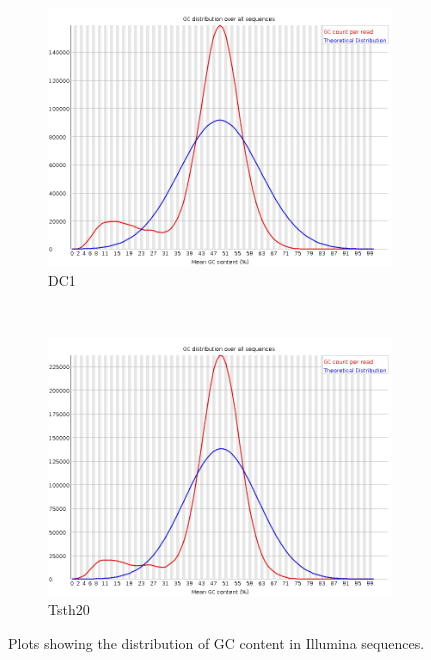 \begin{figure}
  \centering
  \begin{subfigure}{0.7\textwidth}
    \includegraphics[width=\textwidth]{figures/dc1-low-gc-fastqc.png}
    \caption{DC1}
    \label{fig:dc1fastqc}
  \end{subfigure}
  \\
  \begin{subfigure}{0.8\textwidth}
    \includegraphics[width=\textwidth]{figures/tsth20-low-gc-fastqc.png}
    \caption{Tsth20}
    \label{fig:tsth20fastqc}
  \end{subfigure}
  \caption{Plots showing the distribution of GC content in Illumina
    sequences.}
  \label{fig:fastqc-lowgc}
\end{figure}

